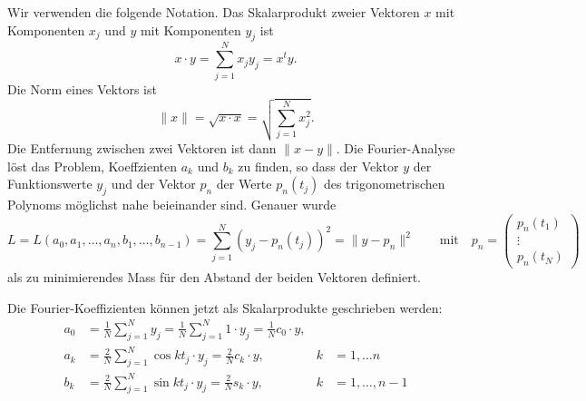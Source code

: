 Wir verwenden die folgende Notation.
Das Skalarprodukt zweier Vektoren $x$ mit Komponenten $x_j$ und $y$ mit
%
Komponenten $y_j$ ist
\begin{equation}
x\cdot y
=
\sum_{j=1}^N x_jy_j
=
x^ty.
\end{equation}
Die Norm eines Vektors ist
%
\begin{equation}
\| x\| = \!\sqrt{x\cdot x} = \!\sqrt{\sum_{j=1}^N x_j^2}.
\end{equation}
Die Entfernung zwischen zwei Vektoren ist dann $\| x-y\|$.
Die Fourier-Analyse löst das Problem, Koeffzienten $a_k$ und $b_k$
zu finden, so dass der Vektor $y$ der Funktionswerte $y_j$ und
der Vektor $p_n$ der Werte $p_n(t_j)$ des trigonometrischen Polynoms
möglichst nahe beieinander sind.
Genauer wurde 
\begin{equation}
L=L(a_0,a_1,\dots,a_n,b_1,\dots,b_{n-1})
=
\sum_{j=1}^N (y_j - p_n(t_j))^2
=
\| y - p_n\|^2
\qquad\text{mit}\quad
p_n=\begin{pmatrix}
p_n(t_1)\\\vdots\\p_n(t_N)
\end{pmatrix}
\end{equation}
als zu minimierendes Mass für den Abstand der beiden Vektoren
definiert.

Die Fourier-Koeffizienten können jetzt als Skalarprodukte geschrieben werden:
\begin{align*}
a_0
&=
\frac1N\sum_{j=1}^N y_j
=
\frac1N\sum_{j=1}^N 1\cdot y_j 
=
\frac1N c_0\cdot y,
\\
a_k
&=
\frac{2}{N}\sum_{j=1}^N
\cos kt_j \cdot y_j
=
\frac2N c_k\cdot y,
&k&=1,\dots n
\\
b_k
&=
\frac2N \sum_{j=1}^N \sin kt_j \cdot y_j
=
\frac2N s_k\cdot y,&k&=1,\dots,n-1
\end{align*}

